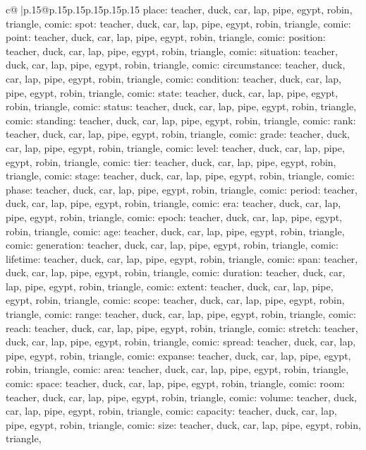 \documentclass{article}
\begin{document}
{\begin{supertabular}{c@{$\;$}|p{.15\linewidth}@{}p{.15\linewidth}p{.15\linewidth}p{.15\linewidth}p{.15\linewidth}p{.15\linewidth}}
{{{place\nTARGETS: teacher, duck, car, lap, pipe, egypt, robin, triangle, comic\n\nCLUE: spot\nTARGETS: teacher, duck, car, lap, pipe, egypt, robin, triangle, comic\n\nCLUE: point\nTARGETS: teacher, duck, car, lap, pipe, egypt, robin, triangle, comic\n\nCLUE: position\nTARGETS: teacher, duck, car, lap, pipe, egypt, robin, triangle, comic\n\nCLUE: situation\nTARGETS: teacher, duck, car, lap, pipe, egypt, robin, triangle, comic\n\nCLUE: circumstance\nTARGETS: teacher, duck, car, lap, pipe, egypt, robin, triangle, comic\n\nCLUE: condition\nTARGETS: teacher, duck, car, lap, pipe, egypt, robin, triangle, comic\n\nCLUE: state\nTARGETS: teacher, duck, car, lap, pipe, egypt, robin, triangle, comic\n\nCLUE: status\nTARGETS: teacher, duck, car, lap, pipe, egypt, robin, triangle, comic\n\nCLUE: standing\nTARGETS: teacher, duck, car, lap, pipe, egypt, robin, triangle, comic\n\nCLUE: rank\nTARGETS: teacher, duck, car, lap, pipe, egypt, robin, triangle, comic\n\nCLUE: grade\nTARGETS: teacher, duck, car, lap, pipe, egypt, robin, triangle, comic\n\nCLUE: level\nTARGETS: teacher, duck, car, lap, pipe, egypt, robin, triangle, comic\n\nCLUE: tier\nTARGETS: teacher, duck, car, lap, pipe, egypt, robin, triangle, comic\n\nCLUE: stage\nTARGETS: teacher, duck, car, lap, pipe, egypt, robin, triangle, comic\n\nCLUE: phase\nTARGETS: teacher, duck, car, lap, pipe, egypt, robin, triangle, comic\n\nCLUE: period\nTARGETS: teacher, duck, car, lap, pipe, egypt, robin, triangle, comic\n\nCLUE: era\nTARGETS: teacher, duck, car, lap, pipe, egypt, robin, triangle, comic\n\nCLUE: epoch\nTARGETS: teacher, duck, car, lap, pipe, egypt, robin, triangle, comic\n\nCLUE: age\nTARGETS: teacher, duck, car, lap, pipe, egypt, robin, triangle, comic\n\nCLUE: generation\nTARGETS: teacher, duck, car, lap, pipe, egypt, robin, triangle, comic\n\nCLUE: lifetime\nTARGETS: teacher, duck, car, lap, pipe, egypt, robin, triangle, comic\n\nCLUE: span\nTARGETS: teacher, duck, car, lap, pipe, egypt, robin, triangle, comic\n\nCLUE: duration\nTARGETS: teacher, duck, car, lap, pipe, egypt, robin, triangle, comic\n\nCLUE: extent\nTARGETS: teacher, duck, car, lap, pipe, egypt, robin, triangle, comic\n\nCLUE: scope\nTARGETS: teacher, duck, car, lap, pipe, egypt, robin, triangle, comic\n\nCLUE: range\nTARGETS: teacher, duck, car, lap, pipe, egypt, robin, triangle, comic\n\nCLUE: reach\nTARGETS: teacher, duck, car, lap, pipe, egypt, robin, triangle, comic\n\nCLUE: stretch\nTARGETS: teacher, duck, car, lap, pipe, egypt, robin, triangle, comic\n\nCLUE: spread\nTARGETS: teacher, duck, car, lap, pipe, egypt, robin, triangle, comic\n\nCLUE: expanse\nTARGETS: teacher, duck, car, lap, pipe, egypt, robin, triangle, comic\n\nCLUE: area\nTARGETS: teacher, duck, car, lap, pipe, egypt, robin, triangle, comic\n\nCLUE: space\nTARGETS: teacher, duck, car, lap, pipe, egypt, robin, triangle, comic\n\nCLUE: room\nTARGETS: teacher, duck, car, lap, pipe, egypt, robin, triangle, comic\n\nCLUE: volume\nTARGETS: teacher, duck, car, lap, pipe, egypt, robin, triangle, comic\n\nCLUE: capacity\nTARGETS: teacher, duck, car, lap, pipe, egypt, robin, triangle, comic\n\nCLUE: size\nTARGETS: teacher, duck, car, lap, pipe, egypt, robin, triangle, }}}
\end{supertabular}}
\end{document}
